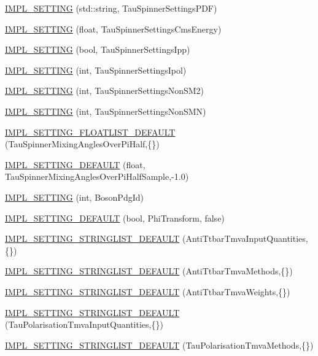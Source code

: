\begin{DoxyCompactItemize}
\item 
\hyperlink{classHttSettings_ab224cd5b480c995543678864a4e0ce0c}{IMPL\_\-SETTING} (std::string, TauSpinnerSettingsPDF)
\item 
\hyperlink{classHttSettings_a71ed554cb43c01667c0b873b920c4b7c}{IMPL\_\-SETTING} (float, TauSpinnerSettingsCmsEnergy)
\item 
\hyperlink{classHttSettings_a3d0bb915529eab47fc3d93b281dc00f1}{IMPL\_\-SETTING} (bool, TauSpinnerSettingsIpp)
\item 
\hyperlink{classHttSettings_a962c50a239f57a36583e58c16df03009}{IMPL\_\-SETTING} (int, TauSpinnerSettingsIpol)
\item 
\hyperlink{classHttSettings_a675074223c4ad2c8654c73fe71c32ebb}{IMPL\_\-SETTING} (int, TauSpinnerSettingsNonSM2)
\item 
\hyperlink{classHttSettings_a84f818de8883e7a52e5ca6d4ac3e2de2}{IMPL\_\-SETTING} (int, TauSpinnerSettingsNonSMN)
\item 
\hyperlink{classHttSettings_a78aa8b6f16bf0238d8da0db91558762d}{IMPL\_\-SETTING\_\-FLOATLIST\_\-DEFAULT} (TauSpinnerMixingAnglesOverPiHalf,\{\})
\item 
\hyperlink{classHttSettings_af0a655ffdbcff54a4d4d0fbbde8bccf0}{IMPL\_\-SETTING\_\-DEFAULT} (float, TauSpinnerMixingAnglesOverPiHalfSample,-\/1.0)
\item 
\hyperlink{classHttSettings_a6fd5d204a586a0fbbbb89f3f940ee017}{IMPL\_\-SETTING} (int, BosonPdgId)
\item 
\hyperlink{classHttSettings_ae8163b41b1187ab3e0f2f808082a18ac}{IMPL\_\-SETTING\_\-DEFAULT} (bool, PhiTransform, false)
\item 
\hyperlink{classHttSettings_aa09d429dfbd5ad6b9e3b4d228f9aa7fe}{IMPL\_\-SETTING\_\-STRINGLIST\_\-DEFAULT} (AntiTtbarTmvaInputQuantities,\{\})
\item 
\hyperlink{classHttSettings_a395368650c207e232b55d75f89786624}{IMPL\_\-SETTING\_\-STRINGLIST\_\-DEFAULT} (AntiTtbarTmvaMethods,\{\})
\item 
\hyperlink{classHttSettings_a96a750d3c33944e4e41172aac5b84aa1}{IMPL\_\-SETTING\_\-STRINGLIST\_\-DEFAULT} (AntiTtbarTmvaWeights,\{\})
\item 
\hyperlink{classHttSettings_a5ba7dd2259f54ac79ea4ca9c5f7690cf}{IMPL\_\-SETTING\_\-STRINGLIST\_\-DEFAULT} (TauPolarisationTmvaInputQuantities,\{\})
\item 
\hyperlink{classHttSettings_a5a3e870b39dd13d3859c9ec5f579a0a2}{IMPL\_\-SETTING\_\-STRINGLIST\_\-DEFAULT} (TauPolarisationTmvaMethods,\{\})
\item 

\end{DoxyCompactItemize}
